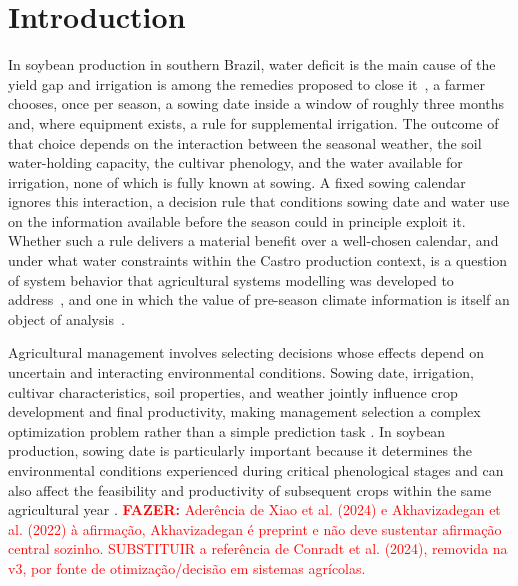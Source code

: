 \documentclass[times,final,authoryear]{elsarticle}
\begin{document}
\linenumbers

\section{Introduction}
\label{introduction}
In soybean production in southern Brazil, water deficit is the main cause of the yield gap and irrigation is among the remedies proposed to close it~\citep{sentelhas2015yieldgap}, a farmer chooses, once per season, a sowing date inside a window of roughly three months and, where equipment exists, a rule for supplemental irrigation. The outcome of that choice depends on the interaction between the seasonal weather, the soil water-holding capacity, the cultivar phenology, and the water available for irrigation, none of which is fully known at sowing. A fixed sowing calendar ignores this interaction, a decision rule that conditions sowing date and water use on the information available before the season could in principle exploit it. Whether such a rule delivers a material benefit over a well-chosen calendar, and under what water constraints within the Castro production context, is a question of system behavior that agricultural systems modelling was developed to address~\citep{jones2017history}, and one in which the value of pre-season climate information is itself an object of analysis~\citep{hansen2002climate}.

Agricultural management involves selecting decisions whose effects depend on uncertain and interacting environmental conditions. Sowing date, irrigation, cultivar characteristics, soil properties, and weather jointly influence crop development and final productivity, making management selection a complex optimization problem rather than a simple prediction task \citep{Xiao2024, Akhavizadegan2022}. In soybean production, sowing date is particularly important because it determines the environmental conditions experienced during critical phenological stages and can also affect the feasibility and productivity of subsequent crops within the same agricultural year \citep{debangshi2025plantingdates, bigolin2025latesoybean, zhang2021modissoybean}. \textcolor{red}{\textbf{FAZER:} Aderência de Xiao et al. (2024) e Akhavizadegan et al. (2022) à afirmação, Akhavizadegan é preprint e não deve sustentar afirmação central sozinho. SUBSTITUIR a referência de Conradt et al. (2024), removida na v3, por fonte de otimização/decisão em sistemas agrícolas.}
\end{document}
